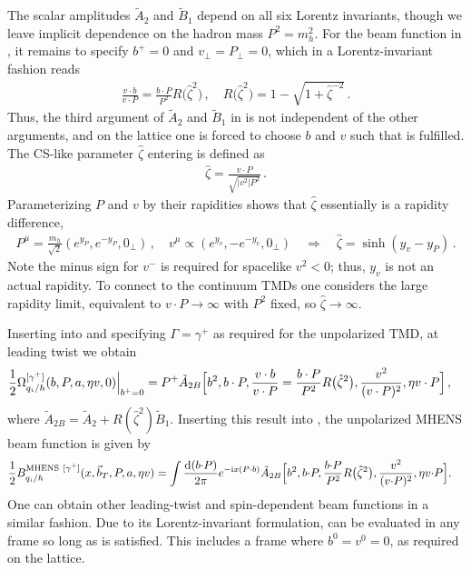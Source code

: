 \documentclass[11pt,a4paper]{article}
\newcommand{\df}{\mathrm{d}}
\newcommand{\img}{\mathrm{i}}
\newcommand{\bt}{\vec b_T}
\newcommand{\Corr}{\Omega}
\newcommand{\q}{q_i}
\begin{document}
The scalar amplitudes $\tilde A_2$ and $\tilde B_1$ depend on all six Lorentz invariants, though we leave implicit dependence on the hadron mass $P^2 = m_h^2$. For the beam function
in , it remains to specify $b^+ = 0$ and $v_\perp = P_\perp = 0$,
which in a Lorentz-invariant fashion reads~\cite{Musch:2011er}
\begin{align} \label{eq:MHENS_constraint}
 \frac{v \cdot b}{v \cdot P}
 = \frac{b \cdot P}{P^2} R\bigl(\hat \zeta^2\bigr)
\,,\quad
 R\bigl(\hat \zeta^2\bigr) = 1 - \sqrt{1 + \hat \zeta^{-2}}
\,.\end{align}
Thus, the third argument of $\tilde A_2$ and $\tilde B_1$ in 
is not independent of the other arguments, and on the lattice one is forced to choose $b$ and $v$
such that  is fulfilled.
The CS-like parameter $\hat\zeta$ entering  is defined as
\begin{align} \label{eq:hatzeta}
 \hat \zeta =  \frac{v \cdot P}{\sqrt{|v^2| P^2}}
\,.\end{align}
Parameterizing $P$ and $v$ by their rapidities shows that $\hat\zeta$ essentially is a rapidity difference,
\begin{align}
 P^\mu = \frac{m_h}{\sqrt 2} (e^{y_P}, e^{-y_P}, 0_\perp)
\,,\quad
v^\mu \propto (e^{y_v}, -e^{- y_v}, 0_\perp)
\quad\Rightarrow\quad
 \hat\zeta = \sinh(y_v - y_P)
\,.\end{align}
Note the minus sign for $v^-$ is required for spacelike $v^2 < 0$;
thus, $y_v$ is not an actual rapidity.
To connect to the continuum TMDs one considers the large rapidity limit, equivalent to $v\cdot P\to \infty$ with $P^2$ fixed, so $\hat\zeta\to \infty$. 

Inserting  into  and specifying
$\Gamma = \gamma^+$ as required for the unpolarized TMD, at leading twist we obtain 
\begin{align}
 \frac12 \Corr_{\q/h}^{[\gamma^+]}(b, P, a, \eta v, 0)\Big|_{b^+ = 0} &
 = P^+ \tilde A_{2B}\Bigl[b^2, b \cdot P, \frac{v \cdot b}{v \cdot P} = \frac{b \cdot P}{P^2} R\bigl(\hat \zeta^2\bigr), \frac{v^2}{(v \cdot P)^2}, \eta v \cdot P\Bigr]
\,,\end{align}
where $\tilde A_{2B} = \tilde A_{2} + R(\hat\zeta^2) \tilde B_1$.
Inserting this result into , the unpolarized MHENS beam function is given by
\begin{align}\label{eq:beam_MHENS_2}
 \frac12 B_{\q/h}^{\mathrm{MHENS}~[\gamma^+]}(x, \bt, P, a, \eta v) &
 = \int\frac{\df (b {\cdot} P)}{2 \pi} e^{-\img x (P {\cdot} b)}
   \tilde A_{2B}\Bigl[b^2, b {\cdot} P, \frac{b {\cdot} P}{P^2} R\bigl(\hat \zeta^2\bigr), \frac{v^2}{(v {\cdot} P)^2}, \eta v {\cdot} P\Bigr]
.
\end{align}
One can obtain other leading-twist and spin-dependent beam functions in a similar fashion.
Due to its Lorentz-invariant formulation,  can be evaluated in
any frame so long as  is satisfied.
This includes a frame where $b^0 = v^0 = 0$, as required on the lattice.
\end{document}
